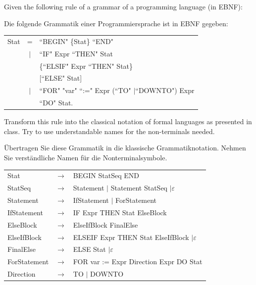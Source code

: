 \documentclass{exam}
\theoremstyle{definition}
\theoremstyle{definition}
\newenvironment{grammar}
	{\begin{tabular}[b]{lcl}}
	{\end{tabular}}
\newcommand{\alternative}{$\mid$}
\begin{document}
\begin{center} 
\end{center}

\begin{questions}

	
	Given the following rule of a grammar of a programming language (in EBNF):
	
	\begin{otherlanguage}{german}
		Die folgende Grammatik einer Programmiersprache ist in EBNF gegeben:
	\end{otherlanguage}
	
	\begin{grammar}
		Stat & = & ``BEGIN" \{Stat\} ``END" \\
		& \alternative & ``IF" Expr ``THEN" Stat \\
		&& \{``ELSIF" Expr ``THEN" Stat\} \\
		&& [``ELSE" Stat] \\
		& \alternative & ``FOR" "var" ``:=" Expr (``TO" \alternative ``DOWNTO") Expr \\
		&& ``DO" Stat.
	\end{grammar}
	
	Transform this rule into the classical notation of formal languages as presented in class. Try to use
	understandable names for the non-terminals needed.

	\begin{otherlanguage}{german}
		Übertragen Sie diese Grammatik in die klassische Grammatiknotation. Nehmen Sie verständliche Namen
		für die Nonterminalsymbole.
	\end{otherlanguage}
	
\begin{solution}
	
		\begin{tabular}[b]{lcl}
			Stat & $\to$ & BEGIN StatSeq END \\
			StatSeq & $\to$ & Statement $\mid$ Statement StatSeq $\mid \varepsilon$ \\
			Statement & $\to$ & IfStatement $\mid$ ForStatement \\
			IfStatement & $\to$ & IF Expr THEN Stat ElseBlock \\
			ElseBlock & $\to$ & ElseIfBlock FinalElse \\
			ElseIfBlock & $\to$ & ELSEIF Expr THEN Stat ElseIfBlock $\mid \varepsilon$ \\
			FinalElse & $\to$ & ELSE Stat $\mid \varepsilon$ \\
			ForStatement & $\to$ & FOR var := Expr Direction Expr DO Stat \\
			Direction &$\to$ & TO $\mid$ DOWNTO
		\end{tabular}
	\end{solution}
	

\end{questions}
\end{document}
